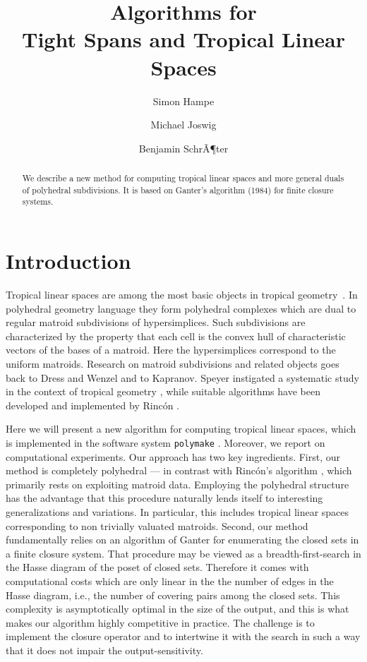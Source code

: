 \documentclass[11pt,a4paper]{amsart}
\title[Algorithms for Tight Spans and Tropical Linear Spaces]{Algorithms for\\Tight Spans and Tropical Linear Spaces}
\author{Simon Hampe \and Michael Joswig \and Benjamin SchrÃ¶ter}
\theoremstyle{definition}
\theoremstyle{plain}
\begin{document}
\begin{abstract}
  We describe a new method for computing tropical linear spaces and more general duals of polyhedral subdivisions.
  It is based on Ganter's algorithm (1984) for finite closure systems.
\end{abstract}

\maketitle

\section{Introduction}
\noindent
Tropical linear spaces are among the most basic objects in tropical geometry~\cite[Chapter 4]{Tropical+Book}.
In polyhedral geometry language they form polyhedral complexes which are dual to regular matroid subdivisions of hypersimplices.
Such subdivisions are characterized by the property that each cell is the convex hull of characteristic vectors of the bases of a matroid.
Here the hypersimplices correspond to the uniform matroids.
Research on matroid subdivisions and related objects goes back to Dress and Wenzel \cite{DressWenzel:1992} and to Kapranov\cite{Kapranov93}.
Speyer instigated a systematic study in the context of tropical geometry \cite{Speyer:2008}, while
suitable algorithms have been developed and implemented by Rinc\'on \cite{Rincon:2013}.

Here we will present a new algorithm for computing tropical linear spaces, which is implemented in the software system {\texttt{poly\-make}\xspace} \cite{DMV:polymake}.
Moreover, we report on computational experiments.
Our approach has two key ingredients.
First, our method is completely polyhedral --- in contrast with Rinc\'on's algorithm \cite{Rincon:2013}, which primarily rests on exploiting matroid data.
Employing the polyhedral structure has the advantage that this procedure naturally lends itself to interesting generalizations and variations.
In particular, this includes tropical linear spaces corresponding to non trivially valuated matroids.
Second, our method fundamentally relies on an algorithm of Ganter \cite{Ganter:1984,GanterReuter:1991} for enumerating the closed sets in a finite closure system.
That procedure may be viewed as a breadth-first-search in the Hasse diagram of the poset of closed sets.
Therefore it comes with computational costs which are only linear in the the number of edges in the Hasse diagram, i.e., the number of covering pairs among the closed sets.
This complexity is asymptotically optimal in the size of the output, and this is what makes our algorithm highly competitive in practice.
The challenge is to implement the closure operator and to intertwine it with the search in such a way that it does not impair the output-sensitivity.
\end{document}
